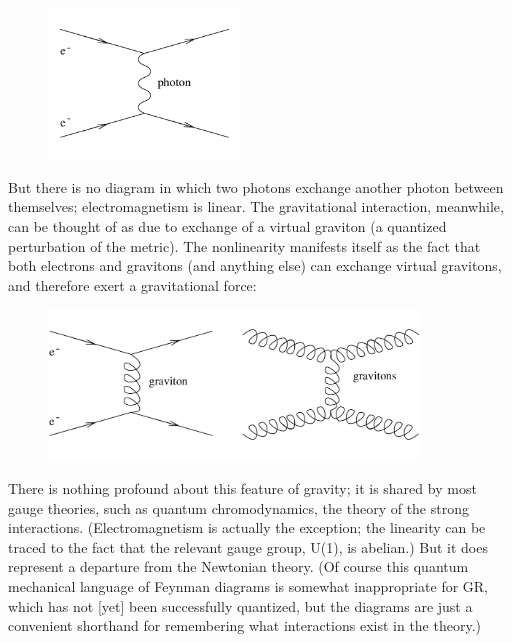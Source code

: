 \documentclass[12pt]{article}
\begin{document}
\begin{figure}[h]
  \centerline{
  \includegraphics[height=4cm]{pdf/four7}}
\end{figure}

\noindent But there is no diagram in which two photons exchange
another photon between themselves; electromagnetism is linear.
The gravitational interaction, meanwhile, can be thought of as due
to exchange of a virtual graviton (a quantized perturbation of the
metric).  The nonlinearity manifests itself as the fact that both
electrons and gravitons (and anything else) can exchange virtual
gravitons, and therefore exert a gravitational force:

\begin{figure}[h]
  \centerline{
  \includegraphics[height=4cm]{pdf/four8}}
\end{figure}

\noindent There is nothing profound about this feature of gravity;
it is shared by most gauge theories, such as quantum chromodynamics,
the theory of the strong interactions.  (Electromagnetism is 
actually the exception; the linearity can be traced to the fact 
that the relevant gauge group, U(1), is abelian.)  But it does
represent a departure from the Newtonian theory.  (Of course this
quantum mechanical language of Feynman diagrams is somewhat 
inappropriate for GR, which has not [yet] been successfully quantized,
but the diagrams are just a convenient shorthand for remembering
what interactions exist in the theory.)
 
\end{document}
